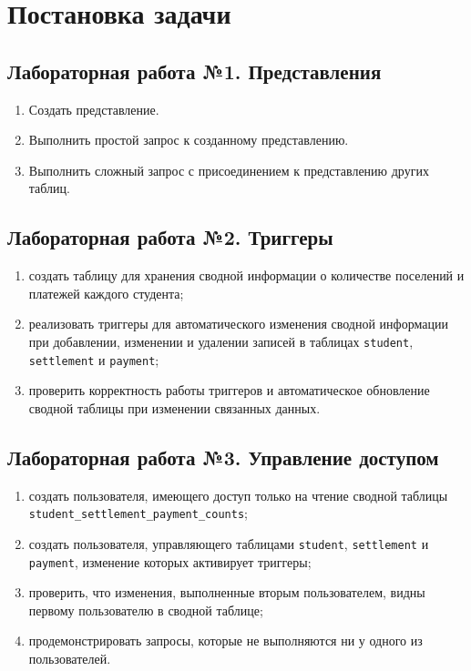 \newpage
\section{Постановка задачи}

\subsection*{Лабораторная работа №1. Представления}
\begin{enumerate}
    \item Создать представление.
    \item Выполнить простой запрос к созданному представлению.
    \item Выполнить сложный запрос с присоединением к представлению других таблиц.
\end{enumerate}

\subsection*{Лабораторная работа №2. Триггеры}
\begin{enumerate}
    \item создать таблицу для хранения сводной информации о количестве поселений и платежей каждого студента;
    \item реализовать триггеры для автоматического изменения сводной информации при добавлении, изменении и удалении записей в таблицах \texttt{student}, \texttt{settlement} и \texttt{payment};
    \item проверить корректность работы триггеров и автоматическое обновление сводной таблицы при изменении связанных данных.
\end{enumerate}

\subsection*{Лабораторная работа №3. Управление доступом}
\begin{enumerate}
    \item создать пользователя, имеющего доступ только на чтение сводной таблицы \texttt{student\_settlement\_payment\_counts};
    \item создать пользователя, управляющего таблицами \texttt{student}, \texttt{settlement} и \texttt{payment}, изменение которых активирует триггеры;
    \item проверить, что изменения, выполненные вторым пользователем, видны первому пользователю в сводной таблице;
    \item продемонстрировать запросы, которые не выполняются ни у одного из пользователей.
\end{enumerate}

